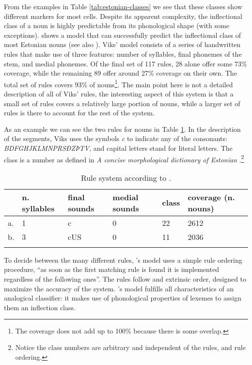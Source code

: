 From the examples in Table \ref{tab:estonian-classes} we see that these classes show different markers for most cells. Despite its apparent complexity, the inflectional class of a noun is highly predictable from its phonological shape (with some exceptions). \textcite{Viks.1995} shows a model that can successfully predict the inflectional class of most Estonian nouns (see also \textcite{Viks.1994}). Viks' model consists of a series of handwritten rules that make use of three features: number of syllables, final phonemes of the stem, and medial phonemes. Of the final set of 117 rules, 28 alone offer some 73\% coverage, while the remaining 89 offer around 27\% coverage on their own. The total set of rules covers 93\% of nouns\footnote{The coverage does not add up to 100\% because there is some overlap.}. The main point here is not a detailed description of all of Viks' rules, the interesting aspect of this system is that a small set of rules covers a relatively large portion of nouns, while a larger set of rules is there to account for the rest of the system.

As an example we can see the two rules for nouns in Table \ref{tab:exe-rules-viks}. In the description of the segments, Viks uses the symbols \textit{c} to indicate any of the consonants: \textit{BDFGHJKLMNPRSÐZÞTV}, and capital letters stand for literal letters. The class is a number as defined in \textit{A concise morphological dictionary of Estonian} \autocite{Viks.1992}.\footnote{Notice the class numbers are arbitrary and independent of the rules, and rule ordering.}

\begin{table}
    \centering
    \caption{Rule system according to \textcite{Viks.1992}.}\label{tab:exe-rules-viks}
    \begin{tabular}[t]{llllll}
      \lsptoprule
      & n. syllables & final sounds & medial sounds & class & coverage (n. nouns) \\
      \midrule
      a. & 1                   & c            & 0             & 22            & 2612          \\
      b. & 3                   & cUS          & 0             & 11            & 2036          \\
      \lspbottomrule
    \end{tabular}
\end{table}

To decide between the many different rules, \citet{Viks.1995}'s model uses a simple rule ordering procedure, ``as soon as the first matching rule is found it is implemented regardless of the following ones''. The rules follow and extrinsic order, designed to maximize the accuracy of the system. \citet{Viks.1995}'s model fulfills all characteristics of an analogical classifier: it makes use of phonological properties of lexemes to assign them an inflection class.

